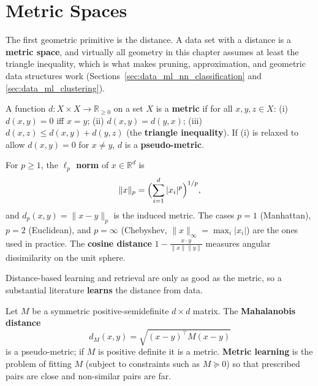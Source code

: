 
\section{Metric Spaces}
\label{sec:data_ml_metric_spaces}

The first geometric primitive is the distance. A data set with a distance is
a \textbf{metric space}, and virtually all geometry in
this chapter assumes at least the triangle inequality, which is what makes
pruning, approximation, and geometric data structures work
(Sections~\ref{sec:data_ml_nn_classification} and
\ref{sec:data_ml_clustering}).

\begin{definition}[Metric]\label{def:data_ml_metric}
  A function $d : X \times X \to \mathbb{R}_{\geq 0}$ on a set $X$ is a
  \textbf{metric} if for all $x, y, z \in X$: (i) $d(x,y) = 0$ iff $x = y$;
  (ii) $d(x,y) = d(y,x)$; (iii) $d(x,z) \leq d(x,y) + d(y,z)$ (the
  \textbf{triangle inequality}). If (i) is
  relaxed to allow $d(x,y) = 0$ for $x \neq y$, $d$ is a
  \textbf{pseudo-metric}.
\end{definition}

\begin{definition}\label{def:data_ml_lp}
  For $p \geq 1$, the \textbf{$\ell_p$ norm} of $x \in \mathbb{R}^d$ is
  \[
    \|x\|_p = \Bigl( \sum_{i=1}^d |x_i|^p \Bigr)^{1/p},
  \]
  and $d_p(x,y) = \|x - y\|_p$ is the induced metric. The cases $p = 1$
  (Manhattan), $p = 2$ (Euclidean), and $p = \infty$ (Chebyshev,
  $\|x\|_\infty = \max_i |x_i|$) are the ones used in practice. The
  \textbf{cosine distance} $1 - \frac{x \cdot y}{\|x\|\|y\|}$ measures
  angular dissimilarity on the unit sphere.
\end{definition}

Distance-based learning and retrieval are only as good as the metric, so a
substantial literature \textbf{learns} the distance from data.

\begin{definition}\label{def:data_ml_mahalanobis}
  Let $M$ be a symmetric positive-semidefinite $d \times d$ matrix. The
  \textbf{Mahalanobis distance}
  \[
    d_M(x,y) = \sqrt{(x - y)^{\top} M (x - y)}
  \]
  is a pseudo-metric; if $M$ is positive definite it is a metric.
  \textbf{Metric learning} is the problem of fitting
  $M$ (subject to constraints such as $M \succeq 0$) so that prescribed
  pairs are close and non-similar pairs are far.
\end{definition}

